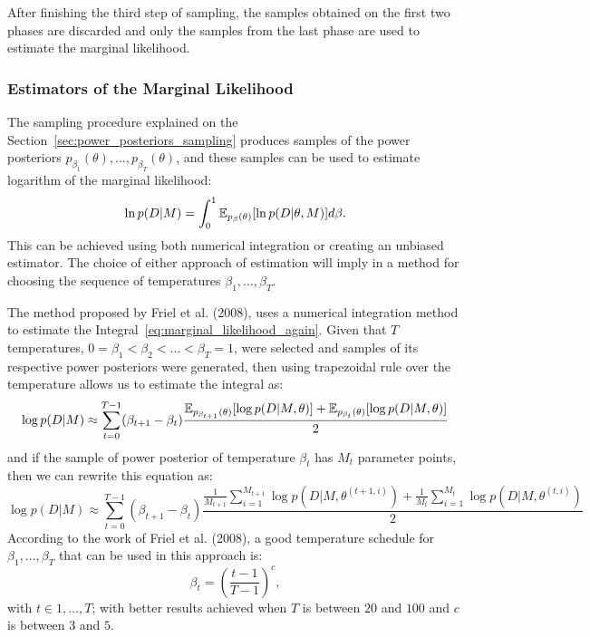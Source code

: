 After finishing the third step of sampling, the samples obtained on the
first two phases are discarded and only the samples from the last phase
are used to estimate the marginal likelihood.

\subsubsection{Estimators of the Marginal Likelihood}
The sampling procedure explained on the 
Section~\ref{sec:power_posteriors_sampling} produces samples of the 
power posteriors $p_{\beta_1} (\theta), \ldots, p_{\beta_T} (\theta)$, 
and these samples can be used to estimate logarithm of the marginal 
likelihood:
\begin{equation}
    \ln p (D | M) = \int_0^1 \mathbb{E}_{p_\beta (\theta)} 
        [\ln p(D|\theta, M)]d\beta.
    \label{eq:marginal_likelihood_again}
\end{equation}
This can be achieved using both numerical integration or creating an
unbiased estimator. The choice of either approach of estimation will
imply in a method for choosing the sequence of temperatures $\beta_1, 
\ldots, \beta_T$. 

The method proposed by Friel et al. (2008), uses a numerical integration 
method to estimate the Integral~\ref{eq:marginal_likelihood_again}. 
Given that $T$ temperatures, $0 = \beta_1 < \beta_2 < \ldots < \beta_T = 
1$, were selected and samples of its respective power posteriors were 
generated, then using trapezoidal rule over the temperature allows us to 
estimate the integral as:
\begin{equation*}
    \log{p(D| M)} \approx \sum_{t = 0}^{T - 1} (\beta_{t + 1} - \beta_t)
\frac{
    \mathbb{E}_{p_{\beta_{t + 1}} (\theta)}[\log p(D | M, \theta)]
+ 
    \mathbb{E}_{p_{\beta_{t}} (\theta)}[\log p(D | M, \theta)]}
{2}
\end{equation*}
and if the sample of power posterior of temperature $\beta_t$ has $M_t$
parameter points, then we can rewrite this equation as:
\begin{equation}
\log{p(D| M)} \approx \sum_{t = 0}^{T - 1} (\beta_{t + 1} - \beta_t)
\frac{
    \frac{1}{M_{t + 1}}
    \sum_{i = 1}^{M_{t + 1}}  \log p(D | M, \theta^{(t + 1, i)})
+ 
    \frac{1}{M_t}
    \sum_{i = 1}^{M_t}  \log p(D | M, \theta^{(t, i)})}
{2}
\end{equation}
According to the work of Friel et al. (2008), a good temperature 
schedule for $\beta_1, \ldots, \beta_T$ that can be used in this 
approach is:
\begin{equation*}
    \beta_t = \left(\frac{t - 1}{T - 1}\right)^{c}, 
\end{equation*}
with $t \in {1, \ldots, T}$; with better results achieved when $T$ is
between $20$ and $100$ and $c$ is between $3$ and $5$.

